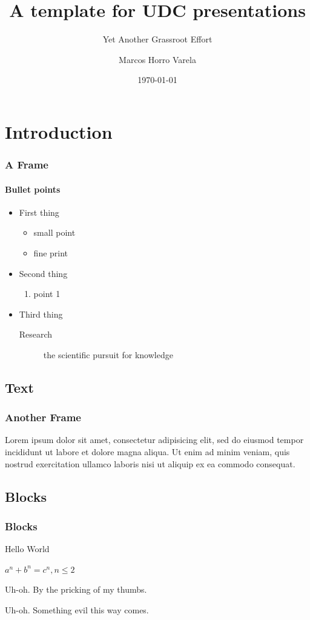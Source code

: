 \documentclass{beamer}
\title{A template for UDC presentations}
\subtitle{Yet Another Grassroot Effort}
\author{Marcos Horro Varela}
\date{\today}
\institute{\url{marcos.horro@udc.es}\\\url{http://markos-horro.com}}
\begin{document}
\begin{frame}[plain,t]
\titlepage
\end{frame}

\section{Introduction}
\begin{frame}
\frametitle{A Frame}
\framesubtitle{Bullet points}
\begin{itemize}
\item First thing
	\begin{itemize}
	\item small point
	\item fine print
	\end{itemize}
\item Second thing
	\begin{enumerate}
	\item point 1
	\end{enumerate}
\item Third thing
	\begin{description}
	\item[Research] the scientific pursuit for knowledge
	\end{description}
\end{itemize}
\end{frame}

\subsection{Text}
\begin{frame}
\frametitle{Another Frame}
Lorem ipsum dolor sit amet, consectetur adipisicing elit, sed do eiusmod tempor incididunt ut labore et dolore magna aliqua. Ut enim ad minim veniam, quis nostrud exercitation ullamco laboris nisi ut aliquip ex ea commodo consequat.
\end{frame}

\subsection{Blocks}
\begin{frame}
\frametitle{Blocks}
\begin{definition}[Greetings]
Hello World
\end{definition}

\begin{theorem}
$a^n + b^n = c^n, n \leq 2$
\end{theorem}

\begin{alertblock}{Uh-oh.}
By the pricking of my thumbs.
\end{alertblock}

\begin{exampleblock}{Uh-oh.}
Something evil this way comes.
\end{exampleblock}

\end{frame}

\ThankYouFrame
\end{document}

